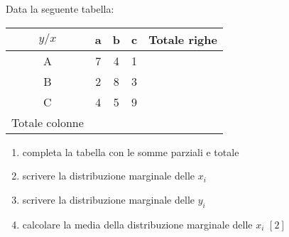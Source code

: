

\subsubsection*{}

\begin{esercizio}
\label{ese:c_stat_001}
Data la seguente tabella:
\begin{center}
\setlength{\tabcolsep}{.8cm}
\begin{tabular}{|c|c|c|c|c|}
\hline
\(y/x\) & a & b & c & Totale righe\\
\hline
A & 7 & 4 & 1 & \\
\hline
B & 2 & 8 & 3 & \\
\hline
C & 4 & 5 & 9 & \\
\hline
Totale colonne & & & & \\
\hline
\end{tabular}
\end{center}

\begin{enumerate}
\item completa la tabella con le somme parziali e totale
\item scrivere la distribuzione marginale delle \(x_i\)
\item scrivere la distribuzione marginale delle \(y_i\)
\item calcolare la media della distribuzione marginale delle \(x_i\) 
\hfill \([2]\)
\end{enumerate}
\end{esercizio}

